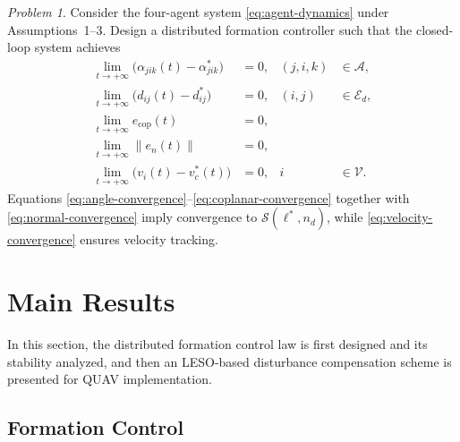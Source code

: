 \documentclass[letterpaper,journal]{IEEEtran}
\theoremstyle{plain}
\theoremstyle{definition}
\theoremstyle{remark}
\newtheorem{problem}{Problem}
\begin{document}
\begin{problem}
Consider the four-agent system \eqref{eq:agent-dynamics} under Assumptions~1--3. Design a distributed formation controller such that the closed-loop system achieves
\begin{align}
\lim_{t\to+\infty}
\bigl(\alpha_{jik}(t)-\alpha_{jik}^*\bigr)&=0,
& (j,i,k)&\in\mathcal A, \label{eq:angle-convergence}\\
\lim_{t\to+\infty}
\bigl(d_{ij}(t)-d_{ij}^*\bigr)&=0,
& (i,j)&\in\mathcal E_d, \label{eq:distance-convergence}\\
\lim_{t\to+\infty}e_{\mathrm{cop}}(t)&=0, \label{eq:coplanar-convergence}\\
\lim_{t\to+\infty}\|e_n(t)\|&=0, \label{eq:normal-convergence}\\
\lim_{t\to+\infty}
\bigl(v_i(t)-v_c^*(t)\bigr)&=0,
& i&\in\mathcal V. \label{eq:velocity-convergence}
\end{align}
Equations \eqref{eq:angle-convergence}--\eqref{eq:coplanar-convergence} together with \eqref{eq:normal-convergence} imply convergence to \(\mathcal S(\ell^*,n_d)\), while \eqref{eq:velocity-convergence} ensures velocity tracking.
\end{problem}


\section{Main Results}
In this section, the distributed formation control law is first designed and its stability analyzed, and then an LESO-based disturbance compensation scheme is presented for QUAV implementation.

\subsection{Formation Control}
\end{document}
